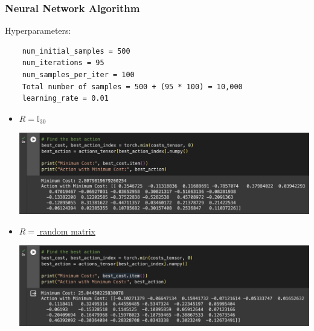 \documentclass{article}
\begin{document}
\subsubsection*{Neural Network Algorithm}
Hyperparameters: 
\begin{verbatim}
    num_initial_samples = 500
    num_iterations = 95
    num_samples_per_iter = 100
    Total number of samples = 500 + (95 * 100) = 10,000
    learning_rate = 0.01
\end{verbatim}
\begin{itemize}
    \item \underline{$R = \mathbb{I}_{30}$}\par
    \includegraphics[scale = 0.5]{NI.png}
    \item \underline{$R= $ random matrix}\par
    \includegraphics[scale=0.5]{NR.png}
\end{itemize}
\end{document}
